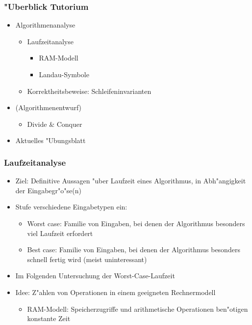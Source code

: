 \documentclass[t]{beamer}
\begin{document}
\begin{frame}
  \frametitle{"Uberblick Tutorium}
  \begin{itemize}
  \item Algorithmenanalyse
    \begin{itemize}
    \item Laufzeitanalyse
      \begin{itemize}
      \item RAM-Modell
      \item Landau-Symbole
      \end{itemize}
    \item Korrektheitsbeweise: Schleifeninvarianten
    \end{itemize}
  \item (Algorithmenentwurf)
    \begin{itemize}
    \item Divide \& Conquer
    \end{itemize}
  \item Aktuelles "Ubungsblatt
  \end{itemize}
\end{frame}

\begin{frame}
  \frametitle{Laufzeitanalyse}
  \begin{itemize}
  \item Ziel: Definitive Aussagen "uber Laufzeit eines Algorithmus,
        in Abh"angigkeit der Eingabegr"o"se(n)
  \item Stufe verschiedene Eingabetypen ein:
    \begin{itemize}
    \item Worst case: Familie von Eingaben, bei denen der Algorithmus besonders
          viel Laufzeit erfordert
    \item Best case: Familie von Eingaben, bei denen der Algorithmus besonders
          schnell fertig wird (meist uninteressant)
    \end{itemize}
  \item Im Folgenden Untersuchung der Worst-Case-Laufzeit
  \item Idee: Z"ahlen von Operationen in einem geeigneten Rechnermodell
    \begin{itemize}
    \item RAM-Modell: Speicherzugriffe und arithmetische Operationen
          ben"otigen konstante Zeit
    \end{itemize}
  \end{itemize}
\end{frame}
\end{document}
